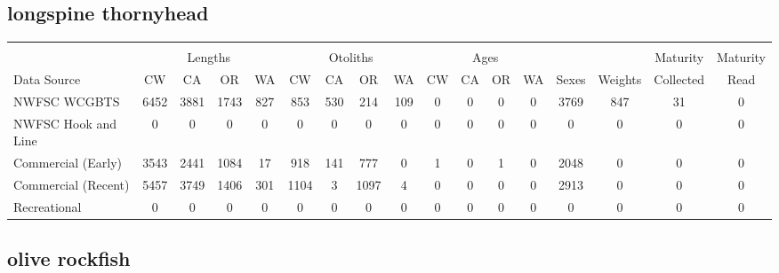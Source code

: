 \documentclass[12pt,]{article}
\begin{document}
\FloatBarrier  

\subsection{longspine thornyhead}\label{longspine-thornyhead}

\begin{table}[ht]
\centering
\begingroup\fontsize{10pt}{10pt}\selectfont
\begin{tabular}{|l|cccc|cccc|cccc|c|c|c|c|}
  \hline
 &  &  &  &  &  &  &  &  &  &  &  &  &  &  &  &  \\ 
   & \multicolumn{4}{c}{Lengths} &  \multicolumn{4}{c}{Otoliths} & \multicolumn{4}{c}{Ages} &  & & Maturity & Maturity\\
 Data Source & CW & CA & OR & WA & CW & CA & OR & WA & CW & CA & OR & WA & Sexes & Weights & Collected & Read\\
 \hline
NWFSC WCGBTS & 6452 & 3881 & 1743 & 827 & 853 & 530 & 214 & 109 & 0 & 0 & 0 & 0 & 3769 & 847 & 31 & 0 \\ 
  NWFSC Hook and Line & 0 & 0 & 0 & 0 & 0 & 0 & 0 & 0 & 0 & 0 & 0 & 0 & 0 & 0 & 0 & 0 \\ 
  Commercial (Early) & 3543 & 2441 & 1084 & 17 & 918 & 141 & 777 & 0 & 1 & 0 & 1 & 0 & 2048 & 0 & 0 & 0 \\ 
  Commercial (Recent) & 5457 & 3749 & 1406 & 301 & 1104 & 3 & 1097 & 4 & 0 & 0 & 0 & 0 & 2913 & 0 & 0 & 0 \\ 
  Recreational & 0 & 0 & 0 & 0 & 0 & 0 & 0 & 0 & 0 & 0 & 0 & 0 & 0 & 0 & 0 & 0 \\ 
   \hline
\end{tabular}
\endgroup
\end{table}

\FloatBarrier  

\subsection{olive rockfish}\label{olive-rockfish}
\end{document}
